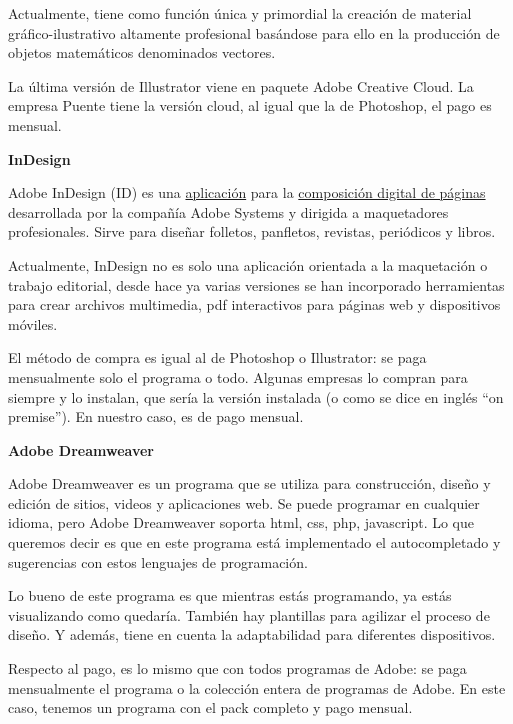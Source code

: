 \documentclass{article}
\begin{document}
Actualmente, tiene como función única y primordial la creación de material gráfico-ilustrativo altamente profesional basándose para ello en la producción de objetos matemáticos denominados vectores.  

La última versión de Illustrator viene en paquete Adobe Creative Cloud. La empresa Puente tiene la versión cloud, al igual que la de Photoshop, el pago es mensual.

\vspace{5mm}

\textbf{InDesign}

Adobe InDesign (ID) es una \href{https://es.wikipedia.org/wiki/Aplicaci\%C3\%B3n_inform\%C3\%A1tica}{aplicación} para la \href{https://es.wikipedia.org/wiki/Maquetaci\%C3\%B3n\_(edici\%C3\%B3n)}{composición digital de páginas} desarrollada por la compañía Adobe Systems y dirigida a maquetadores profesionales. Sirve para diseñar folletos, panfletos, revistas, periódicos y libros.  

Actualmente, InDesign no es solo una aplicación orientada a la maquetación o trabajo editorial, desde hace ya varias versiones se han incorporado herramientas para crear archivos multimedia, pdf interactivos para páginas web y dispositivos móviles.  

El método de compra es igual al de Photoshop o Illustrator: se paga mensualmente solo el programa o todo. Algunas empresas lo compran para siempre y lo instalan, que sería la versión instalada (o como se dice en inglés “on premise”). En nuestro caso, es de pago mensual.

\vspace{5mm}

\textbf{Adobe Dreamweaver}

Adobe Dreamweaver es un programa que se utiliza para construcción, diseño y edición de sitios, videos y aplicaciones web. Se puede programar en cualquier idioma, pero Adobe Dreamweaver soporta html, css, php, javascript. Lo que queremos decir es que en este programa está implementado el autocompletado y sugerencias con estos lenguajes de programación.  

Lo bueno de este programa es que mientras estás programando, ya estás visualizando como quedaría.  También hay plantillas para agilizar el proceso de diseño. Y además, tiene en cuenta la adaptabilidad para diferentes dispositivos.  

Respecto al pago, es lo mismo que con todos programas de Adobe: se paga mensualmente el programa o la colección entera de programas de Adobe. En este caso, tenemos un programa con el pack completo y pago mensual.  
\end{document}
